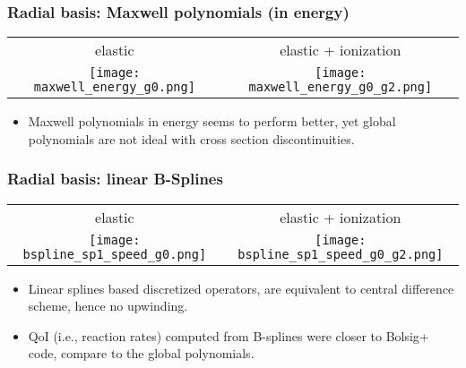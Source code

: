 \documentclass[mathserif, aspectratio=169]{beamer}
\begin{document}
\begin{frame}
	\frametitle{Radial basis: Maxwell polynomials (in energy)}
	\centering
	\begin{tabular}{cc}
		elastic & elastic + ionization \\
		\texttt{[image: maxwell\_energy\_g0.png]} & 
		\texttt{[image: maxwell\_energy\_g0\_g2.png]}
	\end{tabular}
	\begin{itemize}
		\item Maxwell polynomials in energy seems to perform better, yet global polynomials are not ideal with cross section discontinuities. 
	\end{itemize}
\end{frame}

\begin{frame}
	\frametitle{Radial basis: linear B-Splines}
	\centering
	\begin{tabular}{cc}
		elastic & elastic + ionization \\
		\texttt{[image: bspline\_sp1\_speed\_g0.png]} & 
		\texttt{[image: bspline\_sp1\_speed\_g0\_g2.png]}
	\end{tabular}
	\begin{itemize}
		\item Linear splines based discretized operators, are equivalent to central difference scheme, hence no upwinding. 
		\item QoI (i.e., reaction rates) computed from B-splines were closer to Bolsig+ code, compare to the global polynomials. 
	\end{itemize}
	
\end{frame}
\end{document}
